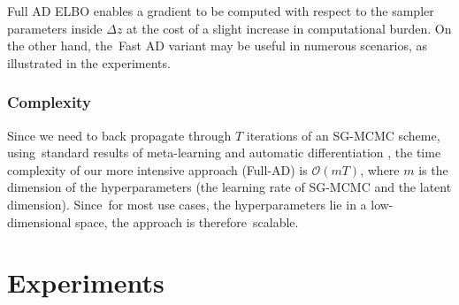  Full AD ELBO enables a gradient to be computed
 with respect to the sampler parameters inside $\Delta z$ at the cost of a slight increase in computational burden.
 On the other hand, the~Fast AD variant may be useful in numerous scenarios, as illustrated in the experiments.

\subsubsection{Complexity} 
Since we need to back propagate through $T$ iterations of an SG-MCMC scheme, using~standard results of meta-learning and automatic differentiation \cite{franceschi2017forward}, the time complexity of our more intensive approach (Full-AD) is $\mathcal{O}(mT)$, where $m$ is the dimension of the hyperparameters (the learning rate of SG-MCMC and the latent dimension). Since~for most use cases, the hyperparameters lie in a low-dimensional space, the approach is
therefore~scalable.















\section{Experiments}\label{sec:exps}

